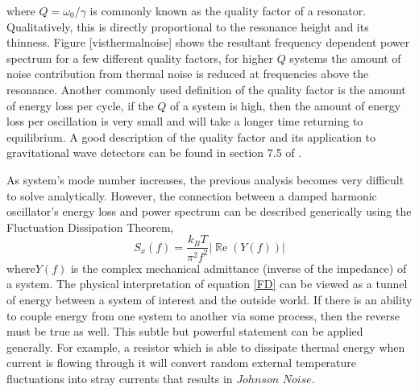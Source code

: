 		where $Q=\omega_{0}/\gamma$ is commonly known as the quality factor of a resonator.  Qualitatively, this is directly proportional to the resonance height and its thinness.  Figure [visthermalnoise] shows the resultant frequency dependent power spectrum for a few different quality factors, for higher $Q$ systems the amount of noise contribution from thermal noise is reduced at frequencies above the resonance.  Another commonly used definition of the quality factor is the amount of energy loss per cycle, if the $Q$ of a system is high, then the amount of energy loss per oscillation is very small and will take a longer time returning to equilibrium.  A good description of the quality factor and its application to gravitational wave detectors can be found in section 7.5 of \cite{Saulson}.
		
		As system's mode number increases, the previous analysis becomes very difficult to solve analytically. However, the connection between a damped harmonic oscillator's energy loss and power spectrum can be described generically using the Fluctuation Dissipation Theorem,
		\begin{equation}\label{FD}
		S_x(f) = \frac{k_B T}{\pi^2 f^2} \vert \operatorname{\mathbb{R}e} (Y(f)) \vert
		\end{equation}
		where$Y(f)$ is the complex mechanical admittance (inverse of the impedance) of a system. The physical interpretation of equation \ref{FD} can be viewed as a tunnel of energy between a system of interest and the outside world.  If there is an ability to couple energy from one system to another via some process, then the reverse must be true as well. This subtle but powerful statement can be applied generally.  For example, a resistor which is able to dissipate thermal energy when current is flowing through it will convert random external temperature fluctuations into stray currents that results in $Johnson$ $Noise$.
		
